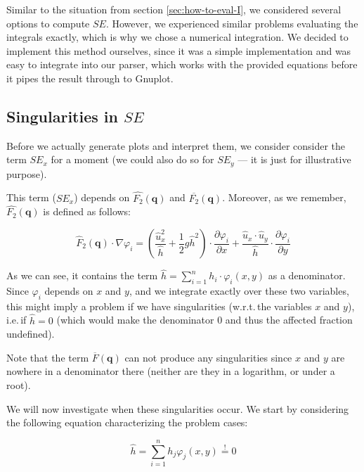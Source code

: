 \documentclass[a4paper, twoside]{article}
\newcommand{\pd}[2]{\dfrac{\partial #1}{\partial #2}}
\renewcommand{\phi}{\varphi}
\begin{document}
Similar to the situation from section \ref{sec:how-to-eval-I}, we considered several options to compute $SE$. However, we experienced similar problems evaluating the integrals exactly, which is why we chose a numerical integration. We decided to implement this method ourselves, since it was a simple implementation and was easy to integrate into our parser, which works with the provided equations before it pipes the result through to Gnuplot.

\subsection{\texorpdfstring{Singularities in $SE$}{Singularities in SE}}
\label{sec:stiffness-analysis-singularities}

Before we actually generate plots and interpret them, we consider consider the term $SE_x$ for a moment (we could also do so for $SE_y$ --- it is just for illustrative purpose).

This term ($SE_x$) depends on $\widehat{F_2}(\mathbf{q})$ and $\overline{F_2}(\mathbf{q})$. Moreover, as we remember, $\widehat{F_2}(\mathbf{q})$ is defined as follows:

\begin{equation*}
  \widehat{F}_2(\mathbf{q}) \cdot \nabla \phi_i =
  \left( \frac{\widehat{u}_x^2}{\widehat{h}} + \frac{1}{2} g \widehat{h}^2 \right) \cdot \pd{\phi_i}{x} +
  \frac{\widehat{u}_x \cdot \widehat{u}_y }{\widehat{h}} \cdot \pd{\phi_i}{y}
\end{equation*}

As we can see, it contains the term $\widehat{h} = \sum_{i=1}^n h_i \cdot \phi_i(x,y)$ as a denominator. Since $\phi_i$ depends on $x$ and $y$, and we integrate exactly over these two variables, this might imply a problem if we have singularities (w.r.t.\,the variables $x$ and $y$), i.e.\,if $\widehat h = 0$ (which would make the denominator 0 and thus the affected fraction undefined).

Note that the term $\overline{F}(\mathbf{q})$ can not produce any singularities since $x$ and $y$ are nowhere in a denominator there (neither are they in a logarithm, or under a root).

We will now investigate when these singularities occur. We start by considering the following equation characterizing the problem cases:

\begin{equation*}
  \widehat{h} = \sum_{i=1}^n h_j \phi_j(x,y) \stackrel{!}{=} 0
\end{equation*}
\end{document}
